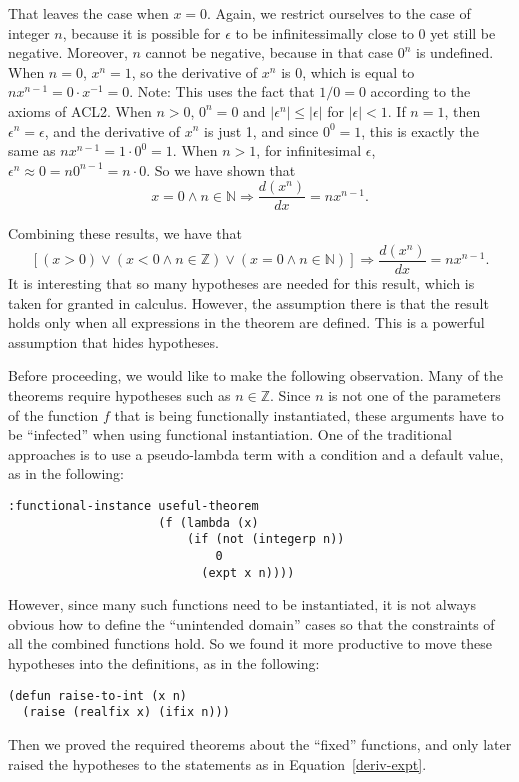 \documentclass[copyright,creativecommons]{eptcs}
\begin{document}
That leaves the case when $x=0$. Again, we restrict ourselves to the
case of integer $n$, because it is possible for $\epsilon$ to be
infinitessimally close to $0$ yet still be negative. Moreover, $n$
cannot be negative, because in that case $0^n$ is undefined.
When $n=0$, $x^n=1$, so the derivative of $x^n$ is 0, which is equal
to $n x^{n-1} = 0\cdot x^{-1} = 0$. Note: This uses the fact that $1/0 =
0$ according to the axioms of ACL2.
When $n>0$, $0^n = 0$ and $|\epsilon^n| \le
|\epsilon|$ for $|\epsilon| < 1$. If $n=1$, then
$\epsilon^n=\epsilon$, and the derivative of $x^n$ is just 1, and
since $0^0=1$, this is exactly the same as $n x^{n-1} = 1 \cdot 0^{0}
= 1$.  When $n>1$, for infinitesimal $\epsilon$, $\epsilon^n \approx 0
= n 0^{n-1} = n \cdot 0$. So we have shown that 
\begin{equation}
x=0 \wedge n \in \mathbb{N} \Rightarrow \frac{d(x^n)}{dx} = n x^{n-1}.
\end{equation}

Combining these results, we have that
\begin{equation}
\label{deriv-expt}
\left[
(x>0) \vee 
(x<0 \wedge n \in \mathbb{Z}) \vee
(x=0 \wedge n \in \mathbb{N}) \right] \Rightarrow \frac{d(x^n)}{dx} = n x^{n-1}.
\end{equation}
It is interesting that so many hypotheses are needed for this result,
which is taken for granted in calculus. However, the assumption there
is that the result holds only when all expressions in the theorem are
defined. This is a powerful assumption that hides hypotheses.

Before proceeding, we would like to make the following
observation. Many of the theorems require hypotheses such as $n \in
\mathbb{Z}$. Since $n$ is not one of the parameters of the function
$f$ that is being functionally instantiated, these arguments have to
be ``infected'' when using functional instantiation. One of the
traditional approaches is to use a pseudo-lambda term with a condition
and a default value, as in the following:
\begin{lstlisting}
:functional-instance useful-theorem
                     (f (lambda (x)
                         (if (not (integerp n))
                             0
                           (expt x n))))
\end{lstlisting}
However, since many such functions need to be instantiated, it is not
always obvious how to define the ``unintended domain'' cases so that
the constraints of all the combined functions hold. So we found it more
productive to move these hypotheses into the definitions, as in the
following:
\begin{lstlisting}
(defun raise-to-int (x n)
  (raise (realfix x) (ifix n)))
\end{lstlisting}
Then we proved the required theorems about the ``fixed'' functions,
and only later raised the hypotheses to the statements as in Equation~\ref{deriv-expt}.
\end{document}
